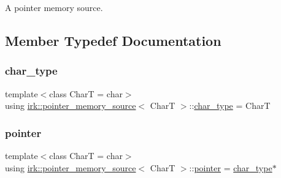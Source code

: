 A pointer memory source. 

\subsection{Member Typedef Documentation}
\mbox{\label{classirk_1_1pointer__memory__source_a4b778df8efee229fdafbd4de413dbf61}} 
\subsubsection{\texorpdfstring{char\+\_\+type}{char\_type}}
{\footnotesize\ttfamily template$<$class CharT  = char$>$ \\
using \mbox{\hyperlink{classirk_1_1pointer__memory__source}{irk\+::pointer\+\_\+memory\+\_\+source}}$<$ CharT $>$\+::\mbox{\hyperlink{classirk_1_1pointer__memory__source_a4b778df8efee229fdafbd4de413dbf61}{char\+\_\+type}} =  CharT}

\mbox{\label{classirk_1_1pointer__memory__source_aba722220e2243bb6ccc979f43ae159f6}} 
\subsubsection{\texorpdfstring{pointer}{pointer}}
{\footnotesize\ttfamily template$<$class CharT  = char$>$ \\
using \mbox{\hyperlink{classirk_1_1pointer__memory__source}{irk\+::pointer\+\_\+memory\+\_\+source}}$<$ CharT $>$\+::\mbox{\hyperlink{classirk_1_1pointer__memory__source_aba722220e2243bb6ccc979f43ae159f6}{pointer}} =  \mbox{\hyperlink{classirk_1_1pointer__memory__source_a4b778df8efee229fdafbd4de413dbf61}{char\+\_\+type}}$\ast$}

\mbox{\label{classirk_1_1pointer__memory__source_a6dd95b7b51c414d4fe531ee7375ac071}} 
